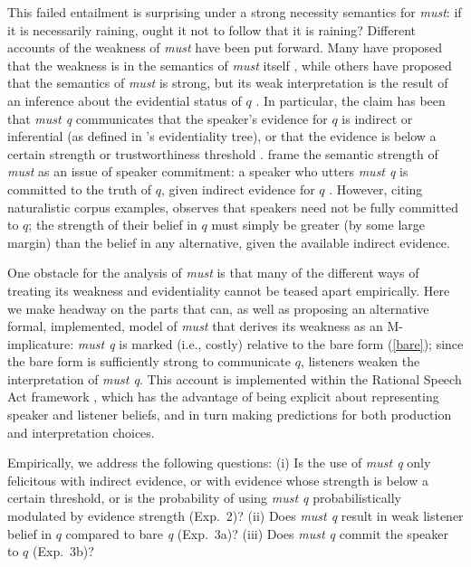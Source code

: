 \documentclass[11pt]{article}
\newcommand{\red}[1]{\textcolor{Red}{#1}}
\begin{document}
This failed entailment is surprising under a strong necessity semantics for \emph{must}: if it is necessarily raining, ought it not to follow that it is raining? Different accounts of the weakness of \emph{must} have been put forward. Many have proposed that the weakness is in the semantics of \emph{must} itself \citep{kratzer1991, lassiter2014salt}, while others have proposed that the semantics of \emph{must} is strong, but its weak interpretation is the result of an inference about the evidential status of $q$ \citep{vonfintelgillies2010}. In particular, the claim has been that \emph{must q} communicates that the speaker's evidence for $q$ is indirect or inferential (as defined in \citep{willett1988}'s evidentiality tree), or that the evidence is below a certain strength or trustworthiness threshold \citep{matthewson2015}. \citep{vonfintelgillies2010} frame the semantic strength of \emph{must} as an issue of speaker commitment: a speaker who utters \emph{must q} is committed to the truth of $q$, given indirect evidence for $q$ \citep{vonfintelgillies2010}. However, citing naturalistic corpus examples, \citep{lassiter2014salt} observes that speakers need not be fully committed to $q$; the strength of their belief in $q$ must simply be greater (by some large margin) than the belief in any alternative, given the available indirect evidence.

One obstacle for the analysis of \emph{must} is that many of the different ways of treating its weakness and evidentiality cannot be teased apart empirically. Here we make headway on the parts that can, as well as proposing an alternative formal, implemented, model of \emph{must} that derives its weakness as an M-implicature: \emph{must q} is marked (i.e., costly) relative to the bare form (\ref{bare}); since the bare form is sufficiently strong to communicate $q$, listeners weaken the interpretation of \emph{must q}. This account is implemented within the Rational Speech Act framework \citep{frank2012, goodmanstuhlmueller2013}, which has the advantage of being explicit about representing speaker and listener beliefs, and in turn making predictions for both production and  interpretation choices.

Empirically, we address the following questions: (i) Is the use of \emph{must q} only felicitous with indirect evidence, or with evidence whose strength is below a certain threshold, or is the probability of using \emph{must q} probabilistically modulated by evidence strength (Exp.~2)? (ii) Does \emph{must q} result in weak listener belief in $q$ compared to bare \emph{q} (Exp.~3a)? (iii) Does \emph{must q} commit the speaker to $q$ (Exp.~3b)? %
\end{document}
